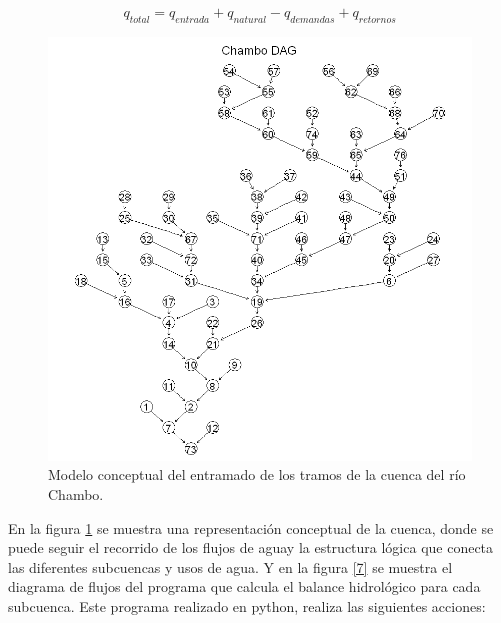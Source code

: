 \begin{equation}
    q_{total} = q_{entrada}+q_{natural}-q_{demandas}+q_{retornos}
    \label{caudal_tot}
\end{equation}

\begin{figure}[h!]
    \begin{center}
      \includegraphics[height=5.in]{Figures/modelo_conceptual_cuenca.png}
      \caption{Modelo conceptual del entramado de los tramos de la cuenca del río Chambo.}
      \label{6}
    \end{center}
  \end{figure}

En la figura \ref{6} se muestra una representación conceptual de la cuenca, donde se puede seguir el recorrido de los 
flujos de aguay la estructura lógica que conecta las diferentes subcuencas y usos de agua. Y en la figura \ref{7} se muestra el 
diagrama de flujos del programa que calcula el balance hidrológico para cada subcuenca. Este programa realizado en python, 
realiza las siguientes acciones:

